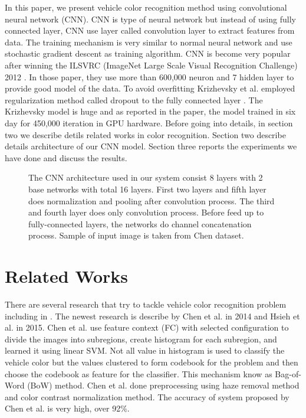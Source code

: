 \documentclass[conference]{IEEEtran}
\begin{document}
In this paper, we present vehicle color recognition method using convolutional neural network (CNN). CNN is type of neural network but instead of using fully connected layer, CNN use layer called convolution layer to extract features from data. The training mechanism is very similar to normal neural network and use stochastic gradient descent as training algorithm. CNN is become very popular after winning the ILSVRC (ImageNet Large Scale Visual Recognition Challenge) 2012 \cite{alex}. In those paper, they use more than 600,000 neuron and 7 hidden layer to provide good model of the data. To avoid overfitting Krizhevsky et al. \cite{alex} employed regularization method called dropout to the fully connected layer \cite{srivastava}. The Krizhevsky model is huge and as reported in the paper, the model trained in six day for 450,000 iteration in GPU hardware. Before going into details, in section two we describe detils related works in color recognition. Section two describe details architecture of our CNN model. Section three reports the experiments we have done and discuss the results.


\begin{figure*}
\centering
{}
\caption{The CNN architecture used in our system consist 8 layers with 2 base networks with total 16 layers. First two layers and fifth layer does normalization and pooling after convolution process. The third and fourth layer does only convolution process. Before feed up to fully-connected layers, the networks do channel concatenation process. Sample of input image is taken from Chen \cite{pchen} dataset.}
\label{fig:cnnarch}
\end{figure*}

\section{Related Works}

There are several research that try to tackle vehicle color recognition problem including in \cite{hsieh,pchen,dule,baek,jwson}. The newest research is describe by Chen et al. \cite{pchen} in 2014 and Hsieh et al. \cite{hsieh} in 2015. Chen et al. use  feature context (FC) with selected configuration to divide the images into subregions, create histogram for each subregion, and learned it using linear SVM. Not all value in histogram is used to classify the vehicle color but the values clustered to form codebook for the problem and then choose the codebook as feature for the classifier. This mechanism know as Bag-of-Word (BoW) method. Chen et al. done preprocessing using haze removal method \cite{khe} and color contrast normalization method. The accuracy of system proposed by Chen et al. is very high, over 92\%. 
\end{document}
